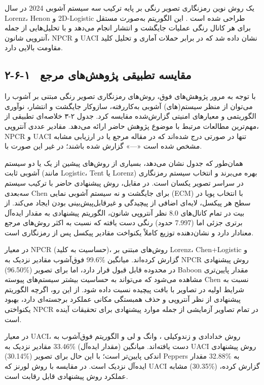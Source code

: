 در سال ‎2024‎ یک روش نوین رمزنگاری تصویر رنگی بر پایه ترکیب سه سیستم آشوبی ‎Lorenz‎، ‎Henon‎ و ‎2D-Logistic‎ طراحی شده است \cite{ref13}. این الگوریتم به‌صورت مستقل برای هر کانال رنگی عملیات جایگشت و انتشار انجام می‌دهد و با تحلیل‌هایی از جمله آنتروپی شانون، ‎NPCR‎ و ‎UACI‎ نشان داده شد که در برابر حملات آماری و تحلیل کلید مقاومت بالایی دارد.

\subsection{۲-۶-۱  مقایسه تطبیقی پژوهش‌های مرجع}

با توجه به مرور پژوهش‌های فوق، روش‌های رمزنگاری تصویر رنگی مبتنی بر آشوب را می‌توان از منظر سیستم(های) آشوبی به‌کاررفته، سازوکار جایگشت و انتشار، نوآوری الگوریتمی و معیارهای امنیتی گزارش‌شده مقایسه کرد. جدول ۲-۳ خلاصه‌ای تطبیقی از مهم‌ترین مطالعات مرتبط با موضوع پژوهش حاضر ارائه می‌دهد. مقادیر عددی آنتروپی، ‎NPCR‎ و ‎UACI‎ تنها در صورتی درج شده‌اند که در مقاله مرجع یا در ارزیابی مشابه گزارش شده باشند؛ در غیر این صورت با «‎---‎» مشخص شده است.

همان‌طور که جدول نشان می‌دهد، بسیاری از روش‌های پیشین از یک یا دو سیستم آشوبی ثابت (مانند ‎Logistic‎، ‎Tent‎ یا ‎Lorenz‎) بهره می‌برند و انتخاب سیستم رمزنگاری در سراسر تصویر یکسان است. در مقابل، روش پیشنهادی حاضر با ترکیب سیستم سه‌بعدی ‎Chen‎ برای جایگشت و نه سیستم آشوبی نمایی (‎ECM‎) با انتخاب پویا در سطح هر پیکسل، لایه‌ای اضافی از پیچیدگی و غیرقابل‌پیش‌بینی بودن ایجاد می‌کند. از نظر آنتروپی شانون، الگوریتم پیشنهادی به مقدار ایده‌آل ‎8.0‎ بیت در تمام کانال‌های رنگی دست یافته که نسبت به اکثر روش‌های مرجع (حدود ‎7.997‎) برتری جزئی اما معنادار دارد و نشان‌دهنده توزیع کاملاً یکنواخت مقادیر پیکسل پس از رمزنگاری است.

در معیار ‎NPCR‎ (حساسیت به کلید)، روش‌های مبتنی بر ‎Lorenz‎، ‎Chen+Logistic‎ و فوق‌آشوب مقادیر نزدیک به ‎99.6\%‎ گزارش کرده‌اند. میانگین ‎NPCR‎ روش پیشنهادی (‎96.50\%‎) در محدوده قابل قبول قرار دارد، اما برای تصویر ‎Baboon‎ مقدار پایین‌تری مشاهده می‌شود که می‌تواند به حساسیت بیشتر سیستم‌های پیوسته ‎Chen‎ نسبت به شرایط اولیه در تصاویر با بافت پیچیده نسبت داده شود. از این رو، اگرچه الگوریتم پیشنهادی از نظر آنتروپی و حذف همبستگی مکانی عملکرد برجسته‌ای دارد، بهبود یکنواختی ‎NPCR‎ در تمام تصاویر آزمایشی از جمله موارد پیشنهادی برای تحقیقات آینده است.

در معیار ‎UACI‎، روش خدادادی و زندوکیلی \cite{ref7}، وانگ و لی \cite{ref8} و الگوریتم فوق‌آشوب \cite{ref12} به مقادیر نزدیک به ‎33.46\%‎ (مقدار ایده‌آل) دست یافته‌اند. میانگین ‎UACI‎ روش پیشنهادی (‎30.14\%‎) اندکی پایین‌تر است؛ با این حال برای تصویر ‎Peppers‎ مقدار ‎32.88\%‎ به ایده‌آل نزدیک است. در مقایسه با روش لورنز \cite{ref6} که ‎UACI‎ مشابه (‎30.35\%‎) گزارش کرده، عملکرد روش پیشنهادی قابل رقابت است.

